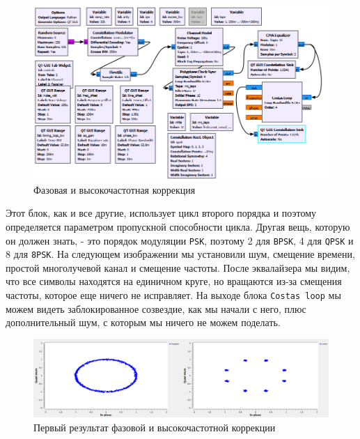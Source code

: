 \documentclass[a4paper]{article}
\begin{document}
            \begin{figure}[H]
                \centering
                \includegraphics[width=\textwidth]{img/p7_1.png}
                \caption{Фазовая и высокочастотная коррекция}
                \label{fig:p7_1}
            \end{figure}
            
            Этот блок, как и все другие, использует цикл второго порядка и поэтому определяется параметром пропускной способности цикла. Другая вещь, которую он должен знать, - это порядок модуляции \texttt{PSK}, поэтому 2 для \texttt{BPSK}, 4 для \texttt{QPSK} и 8 для \texttt{8PSK}. На следующем изображении мы установили шум, смещение времени, простой многолучевой канал и смещение частоты. После эквалайзера мы видим, что все символы находятся на единичном круге, но вращаются из-за смещения частоты, которое еще ничего не исправляет. На выходе блока \texttt{Costas loop} мы можем видеть заблокированное созвездие, как мы начали с него, плюс дополнительный шум, с которым мы ничего не можем поделать.
            
            \begin{figure}[H]
                \centering
                \includegraphics[width=\textwidth]{img/p7_2.png}
                \caption{Первый результат фазовой и высокочастотной коррекции}
                \label{fig:p7_2}
            \end{figure}
            
\end{document}
